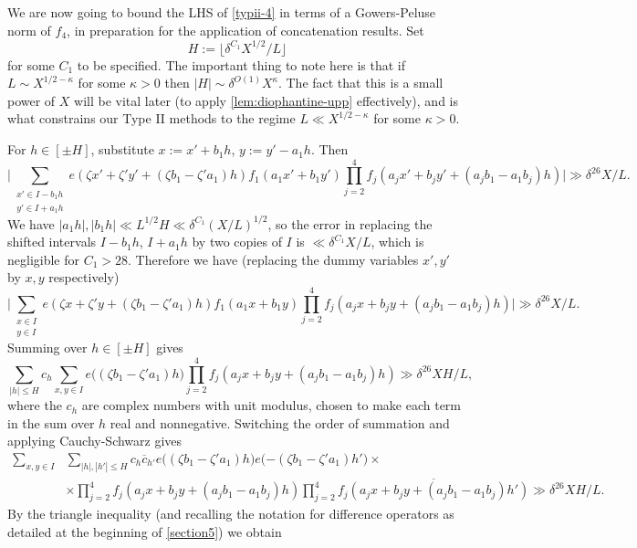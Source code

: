 \documentclass[11pt,reqno]{amsart}
\numberwithin{equation}{section}
\theoremstyle{definition}
\theoremstyle{remark}
\renewcommand{\le}{\leqslant}
\begin{document}
We are now going to bound the LHS of \cref{typii-4} in terms of a Gowers-Peluse norm of $f_4$, in preparation for the application of concatenation results. Set \begin{equation}\label{H-def} H := \lfloor \delta^{C_1}X^{1/2}/L\rfloor\end{equation} for some $C_1$ to be specified. 
The important thing to note here is that if $L \sim X^{1/2 - \kappa}$ for some $\kappa > 0$ then $|H| \sim \delta^{O(1)} X^{\kappa}$. The fact that this is a small power of $X$ will be vital later (to apply \cref{lem:diophantine-upp} effectively), and is what constrains our Type II methods to the regime $L \ll X^{1/2 - \kappa}$ for some $\kappa > 0$.

For $h \in [\pm H]$, substitute $x := x' + b_1 h$, $y := y' - a_1 h$. Then 
\[ \Big| \sum_{\substack{x' \in I - b_1 h \\ y' \in I + a_1 h} }e(\zeta x' + \zeta' y' + (\zeta b_1 - \zeta' a_1) h) f_1(a_1 x' + b_1 y') \prod_{j = 2}^4 f_j (a_j x' + b_j y' + (a_j b_1 - a_1 b_j)h)\Big| \gg \delta^{26}X/L.\]
We have $|a_1 h|,|b_1 h| \ll  L^{1/2} H \ll \delta^{C_1} (X/L)^{1/2}$, so the error in replacing the shifted intervals $I - b_1 h$, $I + a_1 h$ by two copies of $I$ is $\ll \delta^{C_1} X/L$, which is negligible for $C_1 > 28$. Therefore we have (replacing the dummy variables $x', y'$ by $x, y$ respectively) 
\[ \Big| \sum_{\substack{x \in I \\ y \in I} }e(\zeta x + \zeta' y + (\zeta b_1 - \zeta' a_1) h) f_1(a_1 x + b_1 y) \prod_{j = 2}^4 f_j (a_j x + b_j y + (a_j b_1 - a_1 b_j)h)\Big| \gg \delta^{26}X/L.\]
Summing over $h \in [\pm H]$ gives
\begin{equation}\label{7382} \sum_{|h| \le H} c_h \sum_{x, y \in I}  e\big((\zeta b_1 - \zeta' a_1) h\big)\prod_{j = 2}^4 f_j (a_j x + b_j y + (a_j b_1 - a_1 b_j)h)  \gg \delta^{26}XH/L,\end{equation} where the $c_h$ are complex numbers with unit modulus, chosen to make each term in the sum over $h$ real and nonnegative. Switching the order of summation and applying Cauchy-Schwarz gives
\begin{align*} \sum_{x, y \in I} & \sum_{|h|, |h'| \le H} c_h \overline{c}_{h'} e\big((\zeta b_1 - \zeta' a_1) h\big)e\big({-(\zeta b_1 - \zeta' a_1) h'}\big) \times \\ & \times \prod_{j = 2}^4 f_j (a_j x + b_j y + (a_j b_1 - a_1 b_j)h) \prod_{j = 2}^4 \overline{f_j (a_j x + b_j y + (a_j b_1 - a_1 b_j)h')}  \gg \delta^{26}XH/L.\end{align*}
By the triangle inequality (and recalling the notation for difference operators as detailed at the beginning of \cref{section5}) we obtain
\end{document}
